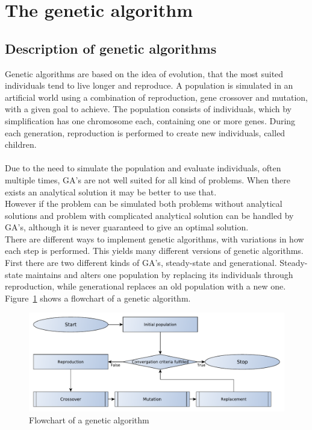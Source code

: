 \pagebreak
\section{The genetic algorithm}
\subsection{Description of genetic algorithms}
Genetic algorithms are based on the idea of evolution, that the most suited individuals tend to live longer and reproduce. A population is simulated in an artificial world using a combination of reproduction, gene crossover and mutation, with a given goal to achieve. The population consists of individuals, which by simplification has one chromosome each, containing one or more genes. During each generation, reproduction is performed to create new individuals, called children.\\
\\
Due to the need to simulate the population and evaluate individuals, often multiple times, GA's are not well suited for all kind of problems. When there exists an analytical solution it may be better to use that.\\ %
However if the problem can be simulated both problems without analytical solutions and problem with complicated analytical solution can be handled by GA's, although it is never guaranteed to give an optimal solution.\\
There are different ways to implement genetic algorithms, with variations in how each step is performed. This yields many different versions of genetic algorithms. First there are two different kinds of GA's, steady-state and generational. Steady-state maintains and alters one population by replacing its individuals through reproduction, while generational replaces an old population with a new one.
Figure~\ref{GeneticFlowChart1} shows a flowchart of a genetic algorithm.
\begin{figure}[t!hb]
	\centering
	\includegraphics[width=\textwidth]{chapter_4_methods/GeneticFlowChart-Generic}
  	\caption[Flowchart of a genetic algorithm]
  	{Flowchart of a genetic algorithm}
	\label{GeneticFlowChart1}
\end{figure}
